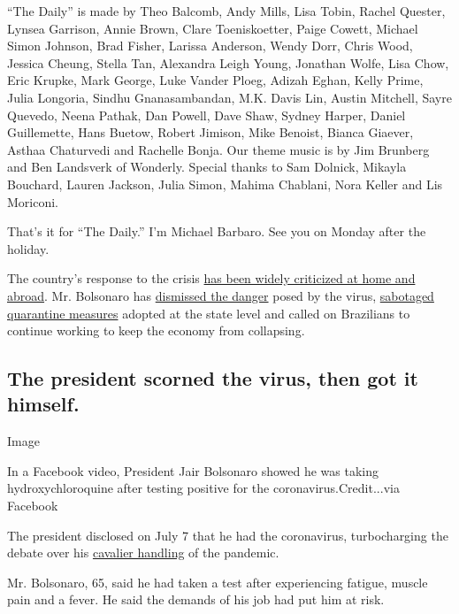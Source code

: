 ``The Daily'' is made by Theo Balcomb, Andy Mills, Lisa Tobin, Rachel
Quester, Lynsea Garrison, Annie Brown, Clare Toeniskoetter, Paige
Cowett, Michael Simon Johnson, Brad Fisher, Larissa Anderson, Wendy
Dorr, Chris Wood, Jessica Cheung, Stella Tan, Alexandra Leigh Young,
Jonathan Wolfe, Lisa Chow, Eric Krupke, Mark George, Luke Vander Ploeg,
Adizah Eghan, Kelly Prime, Julia Longoria, Sindhu Gnanasambandan, M.K.
Davis Lin, Austin Mitchell, Sayre Quevedo, Neena Pathak, Dan Powell,
Dave Shaw, Sydney Harper, Daniel Guillemette, Hans Buetow, Robert
Jimison, Mike Benoist, Bianca Giaever, Asthaa Chaturvedi and Rachelle
Bonja. Our theme music is by Jim Brunberg and Ben Landsverk of Wonderly.
Special thanks to Sam Dolnick, Mikayla Bouchard, Lauren Jackson, Julia
Simon, Mahima Chablani, Nora Keller and Lis Moriconi.

That's it for ``The Daily.'' I'm Michael Barbaro. See you on Monday
after the holiday.

The country's response to the crisis
\href{https://www.nytimes3xbfgragh.onion/2020/07/02/podcasts/the-daily/brazil-coronavirus.html}{has
been widely criticized at home and abroad}. Mr. Bolsonaro has
\href{https://www.nytimes3xbfgragh.onion/2020/04/01/world/americas/brazil-bolsonaro-coronavirus.html}{dismissed
the danger} posed by the virus,
\href{https://www.nytimes3xbfgragh.onion/2020/05/16/world/americas/virus-brazil-deaths.html}{sabotaged
quarantine measures} adopted at the state level and called on Brazilians
to continue working to keep the economy from collapsing.

\hypertarget{the-president-scorned-the-virus-then-got-it-himself}{%
\subsection{The president scorned the virus, then got it
himself.}\label{the-president-scorned-the-virus-then-got-it-himself}}

Image

In a Facebook video, President Jair Bolsonaro showed he was taking
hydroxychloroquine after testing positive for the
coronavirus.Credit...via Facebook

The president disclosed on July 7 that he had the coronavirus,
turbocharging the debate over his
\href{https://www.nytimes3xbfgragh.onion/2020/04/01/world/americas/brazil-bolsonaro-coronavirus.html?searchResultPosition=1}{cavalier
handling} of the pandemic.

Mr. Bolsonaro, 65, said he had taken a test after experiencing fatigue,
muscle pain and a fever. He said the demands of his job had put him at
risk.

